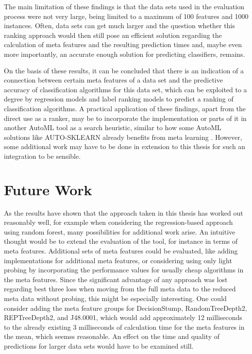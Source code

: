 The main limitation of these findings is that the data sets used in the evaluation process were not very large, being limited to a maximum of 100 features and 1000 instances. Often, data sets can get much larger and the question whether this ranking approach would then still pose an efficient solution regarding the calculation of meta features and the resulting prediction times and, maybe even more importantly, an accurate enough solution for predicting classifiers, remains. 

On the basis of these results, it can be concluded that there is an indication of a connection between certain meta features of a data set and the predictive accuracy of classification algorithms for this data set, which can be exploited to a degree by regression models and label ranking models to predict a ranking of classification algorithms. A practical application of these findings, apart from the direct use as a ranker, may be to incorporate the implementation or parts of it in another AutoML tool as a search heuristic, similar to how some AutoML solutions like AUTO-SKLEARN already benefits from meta learning \cite{feurer2015efficient}. However, some additional work may have to be done in extension to this thesis for such an integration to be sensible.

\section{Future Work}
\label{sec:conclusion:future}
As the results have shown that the approach taken in this thesis has worked out reasonably well, for example when considering the regression-based approach using random forest, many possibilities for additional work arise. An intuitive thought would be to extend the evaluation of the tool, for instance in terms of meta features. Additional sets of meta features could be evaluated, like adding implementations for additional meta features, or considering using only light probing by incorporating the performance values for usually cheap algorithms in the meta features. Since the significant advantage of any approach was lost regarding best three loss when moving from the full meta data to the reduced meta data without probing, this might be especially interesting. One could consider adding the meta feature groups for DecisionStump, RandomTreeDepth2, REPTreeDepth2, and J48.0001, which would add approximately 12 milliseconds to the already existing 3 milliseconds of calculation time for the meta features in the mean, which seemss reasonable. An effect on the time and quality of predictions for larger data sets would have to be examined still.

